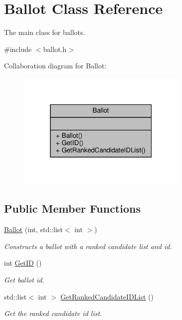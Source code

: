 \hypertarget{classBallot}{}\section{Ballot Class Reference}
\label{classBallot}


The main class for ballots.  




{\ttfamily \#include $<$ballot.\+h$>$}



Collaboration diagram for Ballot\+:
\nopagebreak
\begin{figure}[H]
\begin{center}
\leavevmode
\includegraphics[width=232pt]{classBallot__coll__graph}
\end{center}
\end{figure}
\subsection*{Public Member Functions}
\begin{DoxyCompactItemize}
\item 
\hyperlink{classBallot_a890f4b9091da6f3836b5730d640869f8}{Ballot} (int, std\+::list$<$ int $>$)
\begin{DoxyCompactList}\small\item\em Constructs a ballot with a ranked candidate list and id. \end{DoxyCompactList}\item 
int \hyperlink{classBallot_ab918e416b8b0981b82b20b9df1d7ba51}{Get\+ID} ()
\begin{DoxyCompactList}\small\item\em Get ballot id. \end{DoxyCompactList}\item 
std\+::list$<$ int $>$ \hyperlink{classBallot_a5107d9df309cc5b7ff4a237799e3bff5}{Get\+Ranked\+Candidate\+I\+D\+List} ()
\begin{DoxyCompactList}\small\item\em Get the ranked candidate id list. \end{DoxyCompactList}\end{DoxyCompactItemize}


